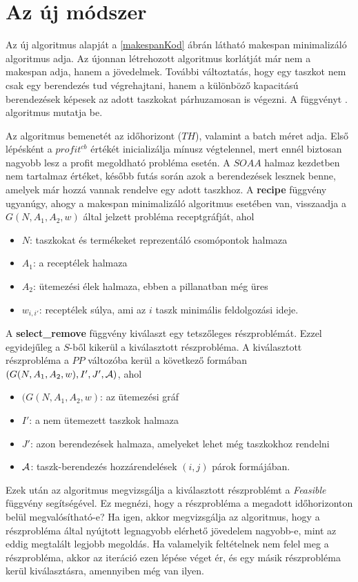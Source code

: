\chapter{Az új módszer}
Az új algoritmus alapját a \ref{makespanKod} ábrán látható makespan minimalizáló algoritmus adja. Az újonnan létrehozott algoritmus korlátját már nem a makespan adja, hanem a jövedelmek. További változtatás, hogy egy taszkot nem csak egy berendezés tud végrehajtani, hanem a különböző kapacitású berendezések képesek az adott taszkokat párhuzamosan is végezni. A függvényt . algoritmus mutatja be.

Az algoritmus bemenetét az időhorizont ($TH$), valamint a batch méret adja. Első lépésként a $profit^{cb}$ értékét inicializálja mínusz végtelennel, mert ennél biztosan nagyobb lesz a profit megoldható probléma esetén. A $SOAA$ halmaz kezdetben nem tartalmaz értéket, később futás során azok a berendezések lesznek benne, amelyek már hozzá vannak rendelve egy adott taszkhoz. A \textbf{recipe} függvény ugyanúgy, ahogy a makespan minimalizáló algoritmus esetében van, visszaadja a $G(N,A_1,A_2,w)$ által jelzett probléma receptgráfját, ahol
\begin{itemize}
  \item[] $N$: taszkokat és termékeket reprezentáló csomópontok halmaza	
  \item[] $A_1$: a receptélek halmaza
  \item[] $A_2$: ütemezési élek halmaza, ebben a pillanatban még üres
  \item[] $w_{i,i'}$: receptélek súlya, ami az $i$ taszk minimális feldolgozási ideje.
\end{itemize} 

A \textbf{select\_remove} függvény kiválaszt egy tetszőleges részproblémát. Ezzel egyidejűleg a $S$-ből kikerül a kiválasztott részprobléma. A kiválasztott részprobléma a $PP$ változóba kerül a következő formában  $(G(N,A_1,A_2,w),I',J',{\cal A})$, ahol 
\begin{itemize}
  \item[] $(G(N,A_1,A_2,w)$: az ütemezési gráf	
  \item[] $I'$: a nem ütemezett taszkok halmaza
  \item[] $J'$: azon berendezések halmaza, amelyeket lehet még taszkokhoz rendelni
  \item[] ${\cal A}$: taszk-berendezés hozzárendelések $(i,j)$ párok formájában.
\end{itemize}

Ezek után az algoritmus megvizsgálja a kiválasztott részproblémt a \textit{Feasible} függvény segítségével. Ez megnézi, hogy a részprobléma a megadott időhorizonton belül megvalósítható-e? Ha igen, akkor megvizsgálja az algoritmus, hogy a részprobléma által nyújtott legnagyobb elérhető jövedelem nagyobb-e, mint az eddig megtalált legjobb megoldás. Ha valamelyik feltételnek nem felel meg a részprobléma, akkor az iteráció ezen lépése véget ér, és egy másik részprobléma kerül kiválasztásra, amennyiben még van ilyen.

